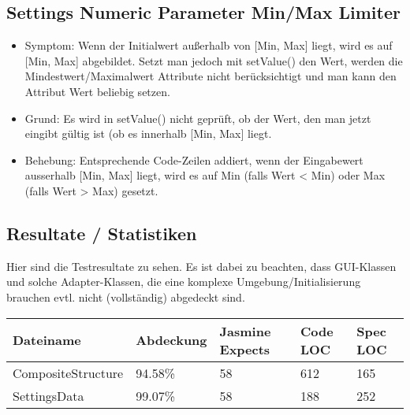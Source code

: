 \documentclass[qualitaetssicherung.tex]{subfiles}
\begin{document}
	\subsection{Settings Numeric Parameter Min/Max Limiter}
		\begin{itemize}
			\item
			Symptom: Wenn der Initialwert außerhalb von [Min, Max] liegt, wird es auf [Min, Max] abgebildet. Setzt man jedoch mit setValue() den Wert, werden die Mindestwert/Maximalwert Attribute nicht berücksichtigt und man kann den Attribut Wert beliebig setzen.
			\item
			Grund: Es wird in setValue() nicht geprüft, ob der Wert, den man jetzt eingibt gültig ist (ob es innerhalb [Min, Max] liegt.
			\item
			Behebung: Entsprechende Code-Zeilen addiert, wenn der Eingabewert ausserhalb [Min, Max] liegt, wird es auf Min (falls Wert < Min) oder Max (falls Wert > Max) gesetzt.
		\end{itemize}
		
\subsection*{Resultate / Statistiken}
		Hier sind die Testresultate zu sehen. Es ist dabei zu beachten, dass GUI-Klassen und solche Adapter-Klassen, die eine komplexe Umgebung/Initialisierung brauchen evtl. nicht (vollständig) abgedeckt sind.
\begin{center}
    \begin{tabular}{| l | l | l | l | l |}
    \hline
    Dateiname & Abdeckung & Jasmine Expects & Code LOC & Spec LOC\\ \hline
    CompositeStructure & 94.58\% & 58 & 612 & 165 \\ \hline
		SettingsData & 99.07\% & 58 & 188 & 252 \\
    \hline
    \end{tabular}
\end{center}
	
\end{document}
